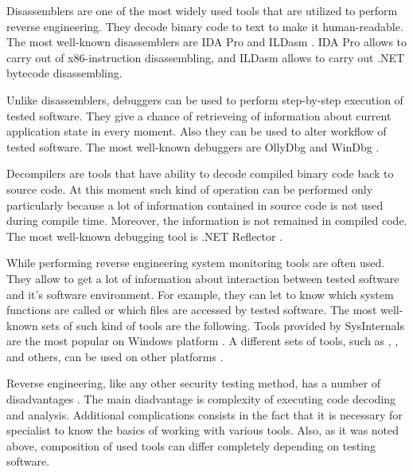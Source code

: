 %
Disassemblers are one of the most widely used tools that are utilized to perform reverse engineering. 
%
They decode binary code to text to make it human-readable. 
%
The most well-known disassemblers are IDA Pro  and ILDasm . 
%
IDA Pro allows to carry out of x86-instruction disassembling, and ILDasm allows to carry out .NET  bytecode disassembling. 

%
Unlike disassemblers, debuggers can be used to perform step-by-step execution of tested software. 
%
They give a chance of retrieveing of information about current application state in every moment. 
%
Also they can be used to alter workflow of tested software. 
%
The most well-known debuggers are OllyDbg  and WinDbg . 

%
Decompilers are tools that have ability to decode compiled binary code back to source code. 
%
At this moment such kind of operation can be performed only particularly because a lot of information contained in source code is not used during compile time. 
%
Moreover, the information is not remained in compiled code. 
%
The most well-known debugging tool is .NET Reflector . 

%
While performing reverse engineering system monitoring tools are often used. 
%
They allow to get a lot of information about interaction between tested software and it's software environment. 
%
For example, they can let to know which system functions are called or which files are accessed by tested software. 
%
The most well-known sets of such kind of tools are the following. 
%
Tools provided by SysInternals  are the most popular on Windows platform . 
%
A different sets of tools, such as , , and others, can be used on other platforms . 

%
Reverse engineering, like any other security testing method, has a number of disadvantages . 
%
The main diadvantage is complexity of executing code decoding and analysis. 
%
Additional complications consists in the fact that it is necessary for specialist to know the basics of working with various tools. 
%
Also, as it was noted above, composition of used tools can differ completely depending on testing software. 


